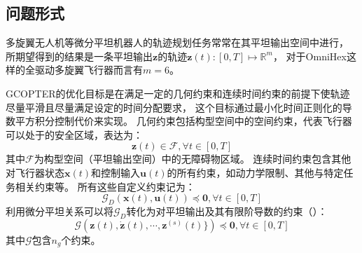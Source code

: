 \subsection{问题形式}\label{subsec:problem_formulation}
多旋翼无人机等微分平坦机器人的轨迹规划任务常常在其平坦输出空间中进行，
所期望得到的结果是一条平坦输出$\bm{z}$的轨迹$\bm{z}(t):[0, T]\mapsto\mathbb{R}^m$，
对于OmniHex这样的全驱动多旋翼飞行器而言有$m=6$。

GCOPTER的优化目标是在满足一定的几何约束和连续时间约束的前提下使轨迹尽量平滑且尽量满足设定的时间分配要求，
这个目标通过最小化时间正则化的导数平方积分控制代价来实现。
几何约束包括构型空间中的空间约束，代表飞行器可以处于的安全区域，表达为：
\begin{equation}
  \bm{z}(t) \in \mathcal{F}, \forall t \in  [0, T] \label{equ:spatial_constraints_in_c_space}
\end{equation}
其中$\mathcal{F}$为构型空间（平坦输出空间）中的无障碍物区域。
连续时间约束包含其他对飞行器状态$\bm{x}(t)$和控制输入$\bm{u}(t)$的所有约束，如动力学限制、其他与特定任务相关约束等。
所有这些自定义约束记为：
\begin{equation}
  \mathcal{G}_D(\bm{x}(t), \bm{u}(t)) \preceq \textbf{0}, \forall t \in [0, T]
  \label{equ:constraints_on_x_and_u}
\end{equation}
利用微分平坦关系可以将$\mathcal{G}_D$转化为对平坦输出及其有限阶导数的约束（）： 
\begin{equation}
  \mathcal{G}(\bm{z}(t), \dot{\bm{z}}(t), \cdots, \bm{z}^{(s)}(t)\}) \preceq \textbf{0}, \forall t \in [0, T]
  \label{equ:constraints_on_z}
\end{equation}
其中$\mathcal{G}$包含$n_g$个约束。

